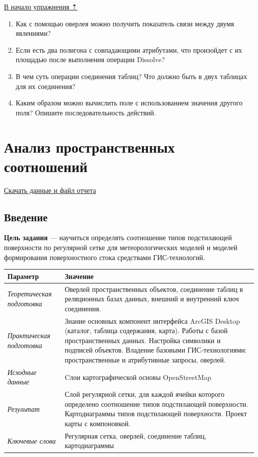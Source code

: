 \documentclass[]{book}
\theoremstyle{definition}
\theoremstyle{definition}
\theoremstyle{definition}
\theoremstyle{remark}
\begin{document}
\protect\hyperlink{overlay}{В начало упражнения ⇡}

\begin{enumerate}
\def\labelenumi{\arabic{enumi}.}
\item
  Как с помощью оверлея можно получить показатель связи между двумя
  явлениями?
\item
  Если есть два полигона с совпадающими атрибутами, что произойдет с их
  площадью после выполнения операции Dissolve?
\item
  В чем суть операции соединения таблиц? Что должно быть в двух таблицах
  для их соединения?
\item
  Каким образом можно вычислить поле с использованием значения другого
  поля? Опишите последовательность действий.
\end{enumerate}

\hypertarget{land-cover-hydro}{%
\chapter{Анализ пространственных соотношений}\label{land-cover-hydro}}

\href{http://autolab.geogr.msu.ru/gis/data/Ex11.zip}{Скачать данные и
файл отчета}

\hypertarget{land-cover-hydro-intro}{%
\section{Введение}\label{land-cover-hydro-intro}}

\textbf{Цель задания} --- научиться определять соотношение типов
подстилающей поверхности по регулярной сетке для метеорологических
моделей и моделей формирования поверхностного стока средствами
ГИС-технологий.

\begin{longtable}[]{@{}ll@{}}
\toprule
Параметр & Значение\tabularnewline
\midrule
\endhead
\emph{Теоретическая подготовка} & Оверлей пространственных объектов,
соединение таблиц в реляционных базах данных, внешний и внутренний ключ
соединения.\tabularnewline
\emph{Практическая подготовка} & Знание основных компонент интерфейса
ArcGIS Desktop (каталог, таблица содержания, карта). Работы с базой
пространственных данных. Настройка символики и подписей объектов.
Владение базовыми ГИС-технологиями: пространственные и атрибутивные
запросы, оверлей.\tabularnewline
\emph{Исходные данные} & Cлои картографической основы
OpenStreetMap\tabularnewline
\emph{Результат} & Слой регулярной сетки, для каждой ячейки которого
определено соотношение типов подстилающей поверхности. Картодиаграммы
типов подстилающей поверхности. Проект карты с
компоновкой.\tabularnewline
\emph{Ключевые слова} & Регулярная сетка, оверлей, соединение таблиц,
картодиаграммы\tabularnewline
\bottomrule
\end{longtable}
\end{document}
